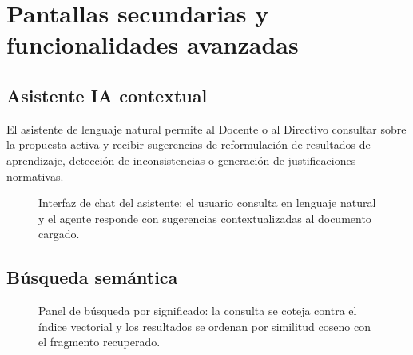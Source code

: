 \section{Pantallas secundarias y funcionalidades avanzadas}
\label{anexo:pantallas_secundarias}

\subsection*{Asistente IA contextual}

El asistente de lenguaje natural permite al Docente o al Directivo
consultar sobre la propuesta activa y recibir sugerencias de reformulación
de resultados de aprendizaje, detección de inconsistencias o generación
de justificaciones normativas.

\begin{figure}[H]
  \centering
  \caption[Asistente IA contextual sobre una propuesta.]{Interfaz de chat
    del asistente: el usuario consulta en lenguaje natural y el agente
    responde con sugerencias contextualizadas al documento cargado.}
  \label{fig:cap_asistente_llm}
\end{figure}

\subsection*{Búsqueda semántica}

\begin{figure}[H]
  \centering
  \caption[Búsqueda semántica en el corpus de propuestas.]{Panel de búsqueda
    por significado: la consulta se coteja contra el índice vectorial y
    los resultados se ordenan por similitud coseno con el fragmento
    recuperado.}
  \label{fig:cap_busqueda_sem}
\end{figure}

